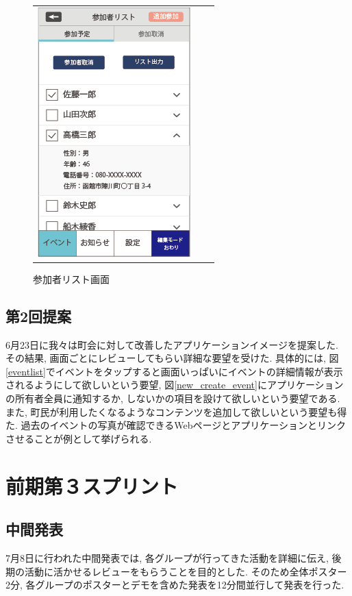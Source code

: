 \begin{figure}[h]
\begin{tabular}{ccc}
\begin{minipage}[t]{0.3\hsize}
      \end{minipage}
      \begin{minipage}[t]{0.3\hsize}
        \centering
        \includegraphics[keepaspectratio, scale=0.5]{process_figures/joinlist.png}
        \caption{参加者リスト画面}
        \label{joinedlist}
      \end{minipage}
    \end{tabular}
\end{figure}

\subsection{第2回提案}
6月23日に我々は町会に対して改善したアプリケーションイメージを提案した.
その結果, 画面ごとにレビューしてもらい詳細な要望を受けた.
具体的には, 図\ref{eventlist}でイベントをタップすると画面いっぱいにイベントの詳細情報が表示されるようにして欲しいという要望,
図\ref{new_create_event}にアプリケーションの所有者全員に通知するか, しないかの項目を設けて欲しいという要望である.
また, 町民が利用したくなるようなコンテンツを追加して欲しいという要望も得た.
過去のイベントの写真が確認できるWebページとアプリケーションとリンクさせることが例として挙げられる.

\section{前期第３スプリント}

\subsection{中間発表}
7月8日に行われた中間発表では, 各グループが行ってきた活動を詳細に伝え, 後期の活動に活かせるレビューをもらうことを目的とした.
そのため全体ポスター2分, 各グループのポスターとデモを含めた発表を12分間並行して発表を行った.

